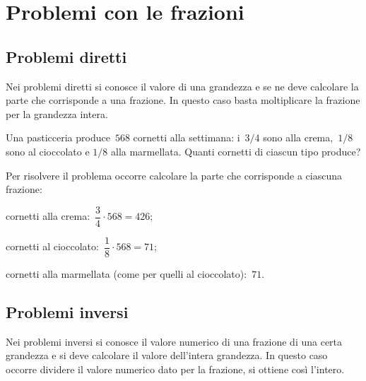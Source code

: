 \section{Problemi con le frazioni}

\subsection{Problemi diretti}
Nei problemi diretti si conosce il valore di una grandezza e se ne deve calcolare la parte
che corrisponde a una frazione. In questo caso basta moltiplicare la
frazione per la grandezza intera.

\begin{exrig}
 \begin{esempio}
Una pasticceria produce~$568$ cornetti alla settimana: i~$3/4$ sono alla crema,~$1/8$ sono al cioccolato e
$1/8$ alla marmellata. Quanti cornetti di ciascun tipo produce?

Per risolvere il problema occorre calcolare la parte che corrisponde a ciascuna frazione:
\begin{itemize*}
\item cornetti alla crema:~$\dfrac{3}{4}\cdot 568 =426$;
\item cornetti al cioccolato:~$\dfrac{1}{8}\cdot 568 =71$;
\item cornetti alla marmellata (come per quelli al cioccolato):~$71$.
\end{itemize*}
 \end{esempio}
\end{exrig}

\subsection{Problemi inversi}

Nei problemi inversi si conosce il valore numerico di una frazione di una certa grandezza e
si deve calcolare il valore dell'intera grandezza.
In questo caso occorre dividere il valore numerico dato per la frazione, si ottiene così l'intero.

